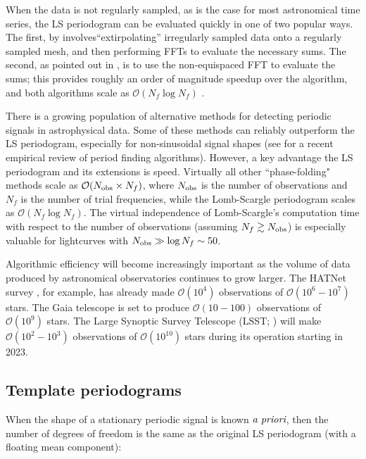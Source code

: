 \documentclass[apj]{emulateapj}
\newcommand{\bigO}{\mathcal{O}}
\begin{document}
When the data is not regularly sampled, as is the case for most astronomical time series,
the LS periodogram can be evaluated quickly in one of two popular ways.
The first, by \cite{Press+Rybicki_1989} involves``extirpolating'' irregularly sampled
data onto a regularly sampled mesh, and then performing FFTs to evaluate the necessary sums.
The second, as pointed out in \cite{Leroy_2012}, is to use the non-equispaced FFT \citep[][NFFT]{NFFT_KKD2009,NFFT_DR1993}
to evaluate the sums; this provides roughly an order of magnitude speedup over the \cite{Press+Rybicki_1989}
algorithm, and both algorithms scale as $\bigO(N_f\log N_f)$ \citep{Leroy_2012}.

There is a growing population of alternative methods for detecting
periodic signals in astrophysical data. Some of these methods can reliably
outperform the LS periodogram, especially for non-sinusoidal signal shapes
(see \cite{Graham_etal_2013} for a recent empirical review of period finding algorithms).
However, a key advantage the LS periodogram and its extensions is speed.
Virtually all other ``phase-folding" methods scale as $\bigO(N_{\rm obs}\times N_f)$, where $N_{\rm obs}$ is the number
of observations and $N_f$ is the number of trial frequencies, while the Lomb-Scargle
periodogram scales as $\bigO(N_f\log N_f)$. The virtual independence of Lomb-Scargle's computation
time with respect to the number of observations (assuming $N_f \gtrsim N_{\rm obs}$)
is especially valuable for lightcurves with $N_{\rm obs} \gg \log N_f \sim 50$.

Algorithmic efficiency will become increasingly important as the volume
of data produced by astronomical observatories continues to grow larger. The HATNet survey
\citep{HATNet}, for example, has already made $\bigO(10^4)$ observations of
$\bigO(10^6-10^7)$ stars. The Gaia telescope \citep{GAIA} is set to produce $\bigO(10-100)$
observations of $\bigO(10^9)$ stars. The Large Synoptic Survey Telescope (LSST; \cite{LSST})
will make $\bigO(10^2-10^3)$ observations of $\bigO(10^{10})$ stars during its operation starting in 2023.


\subsection{Template periodograms}

When the shape of a stationary periodic signal is known $\emph{a priori}$, then the number of degrees of freedom is the same as the original LS periodogram (with a floating mean component):
\end{document}
